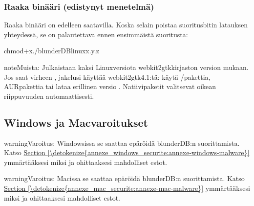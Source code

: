 \documentclass[letterpaper,10pt,finnish]{sphinxmanual}
\begin{document}
\subsubsection{Raaka binääri (edistynyt menetelmä)}
\label{\detokenize{telecharge_install:binaire-brut-methode-avancee}}
\sphinxAtStartPar
Raaka binääri  on edelleen saatavilla. Koska selain poistaa suoritusbitin latauksen yhteydessä, se on palautettava ennen ensimmäistä suoritusta:

\begin{sphinxVerbatim}[commandchars=\\\{\}]
chmod+x./blunderDB\PYGZhy{}linux\PYGZhy{}x.y.z
\end{sphinxVerbatim}

\begin{sphinxadmonition}{note}{Muista:}
\sphinxAtStartPar
Julkaistaan kaksi Linux\sphinxhyphen{}versiota webkit2gtk\sphinxhyphen{}kirjaston version mukaan. Jos saat virheen , jakelusi käyttää webkit2gtk\sphinxhyphen{}4.1:tä: käytä /\sphinxhyphen{}pakettia, AUR\sphinxhyphen{}pakettia tai lataa erillinen versio . Natiivipaketit valitsevat oikean riippuvuuden automaattisesti.
\end{sphinxadmonition}


\subsection{Windows\sphinxhyphen{} ja Mac\sphinxhyphen{}varoitukset}
\label{\detokenize{telecharge_install:avertissements-windows-et-mac}}
\begin{sphinxadmonition}{warning}{Varoitus:}
\sphinxAtStartPar
Windowsissa se saattaa epäröidä blunderDB:n suorittamista. Katso \hyperref[\detokenize{annexe_windows_securite:annexe-windows-malware}]{Section \ref{\detokenize{annexe_windows_securite:annexe-windows-malware}}} ymmärtääksesi miksi ja ohittaaksesi mahdolliset estot.
\end{sphinxadmonition}

\begin{sphinxadmonition}{warning}{Varoitus:}
\sphinxAtStartPar
Macissa se saattaa epäröidä blunderDB:n suorittamista. Katso \hyperref[\detokenize{annexe_mac_securite:annexe-mac-malware}]{Section \ref{\detokenize{annexe_mac_securite:annexe-mac-malware}}} ymmärtääksesi miksi ja ohittaaksesi mahdolliset estot.
\end{sphinxadmonition}
\end{document}
